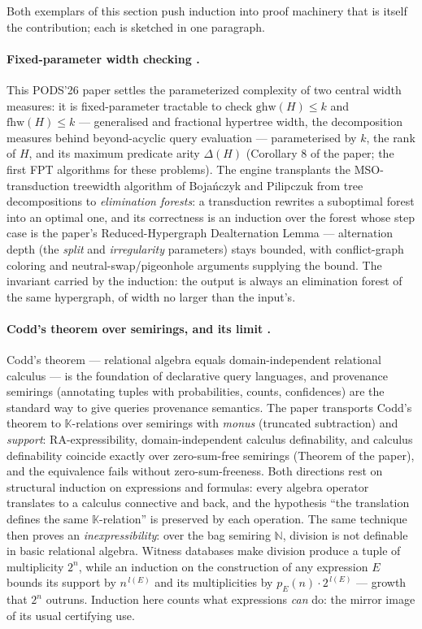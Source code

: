 Both exemplars of this section push induction into proof machinery that is itself the
contribution; each is sketched in one paragraph.

\paragraph{Fixed-parameter width checking \citep{sigmod26-114}\pods.}
This PODS'26 paper settles the parameterized complexity of two central width measures:
it is fixed-parameter tractable to check $\mathrm{ghw}(H) \le k$ and
$\mathrm{fhw}(H) \le k$ --- generalised and fractional hypertree width, the
decomposition measures behind beyond-acyclic query evaluation --- parameterised by
$k$, the rank of $H$, and its maximum predicate arity $\Delta(H)$ (Corollary 8 of the
paper; the first FPT algorithms for these problems). The engine transplants the
MSO-transduction treewidth algorithm of Boja\'nczyk and Pilipczuk from tree
decompositions to \emph{elimination forests}: a transduction rewrites a suboptimal
forest into an optimal one, and its correctness is an induction over the forest whose
step case is the paper's Reduced-Hypergraph Dealternation Lemma --- alternation depth
(the \emph{split} and \emph{irregularity} parameters) stays bounded, with
conflict-graph coloring and neutral-swap/pigeonhole arguments supplying the bound. The
invariant carried by the induction: the output is always an elimination forest of the
same hypergraph, of width no larger than the input's.

\paragraph{Codd's theorem over semirings, and its limit \citep{sigmod26-290}.}
Codd's theorem --- relational algebra equals domain-independent relational calculus ---
is the foundation of declarative query languages, and provenance semirings (annotating
tuples with probabilities, counts, confidences) are the standard way to give queries
provenance semantics. The paper transports Codd's theorem to $\mathbb{K}$-relations
over semirings with \emph{monus} (truncated subtraction) and \emph{support}:
RA-expressibility, domain-independent calculus definability, and calculus definability
coincide exactly over zero-sum-free semirings (Theorem of the paper), and the
equivalence fails without zero-sum-freeness. Both directions rest on structural
induction on expressions and formulas: every algebra operator translates to a calculus
connective and back, and the hypothesis ``the translation defines the same
$\mathbb{K}$-relation'' is preserved by each operation. The same technique then proves
an \emph{inexpressibility}: over the bag semiring $\mathbb{N}$, division is not
definable in basic relational algebra. Witness databases make division produce a tuple
of multiplicity $2^{n}$, while an induction on the construction of any expression $E$
bounds its support by $n^{\,l(E)}$ and its multiplicities by $p_E(n) \cdot
2^{\,l(E)}$ --- growth that $2^{n}$ outruns. Induction here counts what expressions
\emph{can} do: the mirror image of its usual certifying use.


